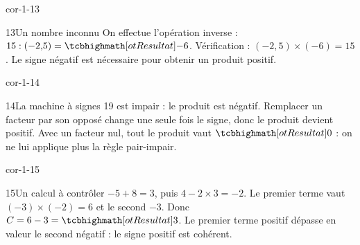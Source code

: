 \begin{blocLivre}{cor-1-13}\begin{corrige}{13}{Un nombre inconnu}
On effectue l’opération inverse : $15:(-2{,}5)=\res{-6}$. Vérification : $(-2{,}5)\times(-6)=15$. Le signe négatif est nécessaire pour obtenir un produit positif.
\end{corrige}\end{blocLivre}
\begin{blocLivre}{cor-1-14}\begin{corrige}{14}{La machine à signes}
19 est impair : le produit est négatif. Remplacer un facteur par son opposé change une seule fois le signe, donc le produit devient positif. Avec un facteur nul, tout le produit vaut $\res0$ : on ne lui applique plus la règle pair-impair.
\end{corrige}\end{blocLivre}
\begin{blocLivre}{cor-1-15}\begin{corrige}{15}{Un calcul à contrôler}
$-5+8=3$, puis $4-2\times3=-2$. Le premier terme vaut $(-3)\times(-2)=6$ et le second $-3$. Donc $C=6-3=\res3$. Le premier terme positif dépasse en valeur le second négatif : le signe positif est cohérent.
\end{corrige}\end{blocLivre}
